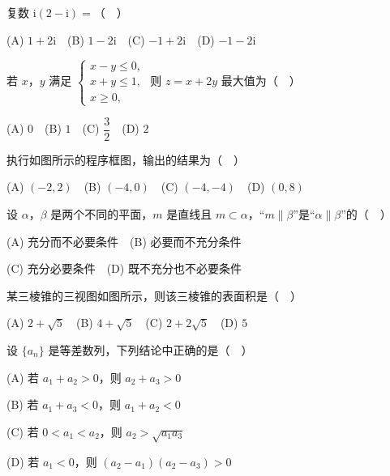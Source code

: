 \begin{question}
复数 \(\mathrm{i}(2-\mathrm{i})=\)（　）

(A) \(1+2\mathrm{i}\)　(B) \(1-2\mathrm{i}\)　(C) \(-1+2\mathrm{i}\)　(D) \(-1-2\mathrm{i}\)

\end{question}
\begin{question}
若 \(x\)，\(y\) 满足 $\begin{cases} x-y\leqslant 0, \\ x+y\leqslant 1, \\ x\geqslant 0, \end{cases}$ 则 \(z=x+2y\) 最大值为（　）

(A) \(0\)　(B) \(1\)　(C) \(\dfrac{3}{2}\)　(D) \(2\)

\Needspace{0.4\textheight}
\end{question}
\begin{question}
执行如图所示的程序框图，输出的结果为（　）
\nopagebreak[4]
\begin{center}\end{center}
\nopagebreak[4]
(A) \((-2,2)\)　(B) \((-4,0)\)　(C) \((-4,-4)\)　(D) \((0,8)\)

\end{question}
\begin{question}
设 \(\alpha\)，\(\beta\) 是两个不同的平面，\(m\) 是直线且 \(m\subset\alpha\)，“\(m\parallel\beta\)”是“\(\alpha\parallel\beta\)”的（　）

(A) 充分而不必要条件　(B) 必要而不充分条件

(C) 充分必要条件　(D) 既不充分也不必要条件

\Needspace{0.4\textheight}
\end{question}
\begin{question}
某三棱锥的三视图如图所示，则该三棱锥的表面积是（　）
\nopagebreak[4]
\begin{center}\end{center}
\nopagebreak[4]
(A) \(2+\sqrt{5}\)　(B) \(4+\sqrt{5}\)　(C) \(2+2\sqrt{5}\)　(D) \(5\)

\end{question}
\begin{question}
设 \(\{a_{n}\}\) 是等差数列，下列结论中正确的是（　）

(A) 若 \(a_{1}+a_{2}>0\)，则 \(a_{2}+a_{3}>0\)

(B) 若 \(a_{1}+a_{3}<0\)，则 \(a_{1}+a_{2}<0\)

(C) 若 \(0<a_{1}<a_{2}\)，则 \(a_{2}>\sqrt{a_{1}a_{3}}\)

(D) 若 \(a_{1}<0\)，则 \((a_{2}-a_{1})(a_{2}-a_{3})>0\)

\Needspace{0.4\textheight}
\end{question}
